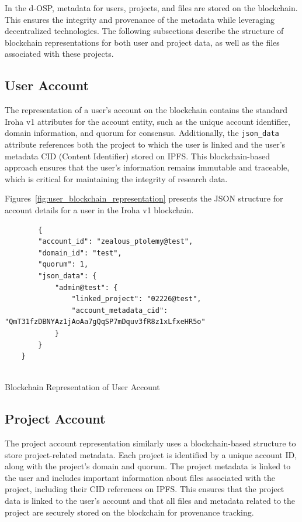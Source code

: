 \documentclass[final]{rc-book-2.14}
\begin{document}
In the d-OSP, metadata for users, projects, and files are stored on the blockchain. This ensures the integrity and provenance of the metadata while leveraging decentralized technologies. The following subsections describe the structure of blockchain representations for both user and project data, as well as the files associated with these projects.

\subsection{User Account}

The representation of a user's account on the blockchain contains the standard Iroha v1 attributes for the account entity, such as the unique account identifier, domain information, and quorum for consensus. Additionally, the \texttt{json\_data} attribute references both the project to which the user is linked and the user's metadata CID (Content Identifier) stored on IPFS. This blockchain-based approach ensures that the user’s information remains immutable and traceable, which is critical for maintaining the integrity of research data.

Figures~\ref{fig:user_blockchain_representation} presents the JSON structure for account details for a user in the Iroha v1 blockchain.


\begin{listing}
    \begin{verbatim}
        {
        "account_id": "zealous_ptolemy@test",
        "domain_id": "test",
        "quorum": 1,
        "json_data": {
            "admin@test": {
                "linked_project": "02226@test",
                "account_metadata_cid": "QmT31fzDBNYAz1jAoAa7gQqSP7mDquv3fR8z1xLfxeHR5o"
            }
        }
    }
  
\end{verbatim}
    \caption{Blockchain Representation of User Account}
    \label{fig:user_blockchain_representation}
\end{listing}



\subsection{Project Account}

The project account representation similarly uses a blockchain-based structure to store project-related metadata. Each project is identified by a unique account ID, along with the project’s domain and quorum. The project metadata is linked to the user and includes important information about files associated with the project, including their CID references on IPFS. This ensures that the project data is linked to the user’s account and that all files and metadata related to the project are securely stored on the blockchain for provenance tracking.
\end{document}
